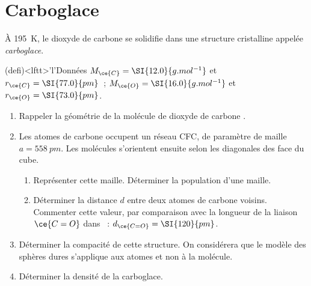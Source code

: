 \documentclass[a4paper, 10pt, final, garamond]{book}
\begin{document}
\section{Carboglace}
À \SI{195}{K}, le dioxyde de carbone se solidifie dans une structure cristalline
appelée \textit{carboglace}.
\begin{tcn}(defi)<lftt>'l'{Données}
	$M_{\ce{C}} = \SI{12.0}{g.mol^{-1}}$ et $r_{\ce{C}} = \SI{77.0}{pm}$~;
	$M_{\ce{O}} = \SI{16.0}{g.mol^{-1}}$ et $r_{\ce{O}} = \SI{73.0}{pm}$.
\end{tcn}
\begin{enumerate}
	\item Rappeler la géométrie de la molécule de dioxyde de carbone .
	\item Les atomes de carbone occupent un réseau CFC, de paramètre de maille $a
		      = \SI{558}{pm}$. Les molécules s'orientent ensuite selon les diagonales des
	      face du cube.
	      \begin{enumerate}
		      \item Représenter cette maille. Déterminer la population d'une maille.
		      \item Déterminer la distance $d$ entre deux atomes de carbone voisins.
		            Commenter cette valeur, par comparaison avec la longueur de la liaison
		            $\ce{C=O}$ dans ~: $d_{\ce{C=O}} = \SI{120}{pm}$.
	      \end{enumerate}
	\item Déterminer la compacité de cette structure. On considérera que le modèle
	      des sphères dures s'applique aux atomes et non à la molécule.
	\item Déterminer la densité de la carboglace.
\end{enumerate}
\end{document}
